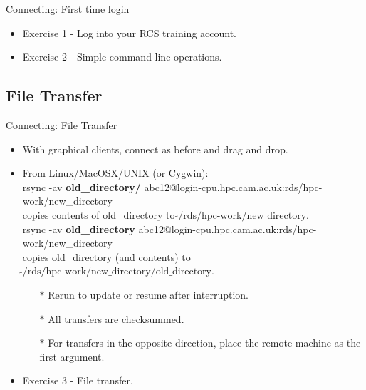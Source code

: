 \begin{frame}[fragile]{Connecting: First time login}
\begin{itemize}
\item{Exercise 1 - Log into your RCS training account.}
  \pause
  \item{Exercise 2 - Simple command line operations.}
\end{itemize}
\end{frame}

\subsection{File Transfer}
\begin{frame}{Connecting: File Transfer}
\begin{itemize}
\item With graphical clients, connect as before and drag and drop.
\pause
\item From Linux/MacOSX/UNIX (or Cygwin):\hfill\\
\alert{\footnotesize rsync -av \textbf{old\_directory/} abc12@login-cpu.hpc.cam.ac.uk:rds/hpc-work/new\_directory}\hfill\\
copies contents of old\_directory to $\tilde{}\text{/rds/hpc-work/new\_directory}$.\hfill\\\smallskip
\pause
\alert{\footnotesize rsync -av \textbf{old\_directory} abc12@login-cpu.hpc.cam.ac.uk:rds/hpc-work/new\_directory}\hfill\\
copies old\_directory (and contents) to $\tilde{}\text{/rds/hpc-work/new\_directory/old\_directory}$.\hfill\\
\pause
\begin{itemize}
\item[$\ast$]Rerun to update or resume after interruption.
\item[$\ast$]All transfers are checksummed.
\item[$\ast$]For transfers in the opposite direction, place the remote machine as the first argument.
\end{itemize}
\pause
\item{Exercise 3 - File transfer.}
\end{itemize}
\end{frame}

